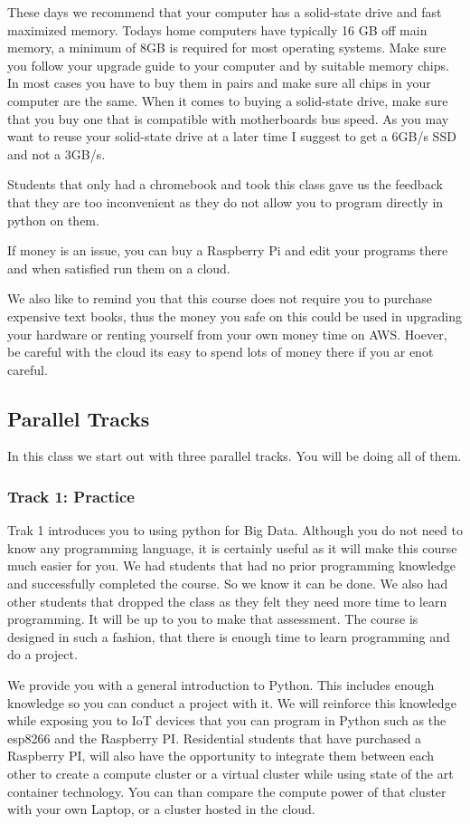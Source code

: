 These days we recommend that your computer has a solid-state drive and
fast maximized memory. Todays home computers have typically 16 GB off
main memory, a minimum of 8GB is required for most operating systems.
Make sure you follow your upgrade guide to your computer and by suitable
memory chips. In most cases you have to buy them in pairs and make sure
all chips in your computer are the same. When it comes to buying a
solid-state drive, make sure that you buy one that is compatible with
motherboards bus speed. As you may want to reuse your solid-state drive
at a later time I suggest to get a 6GB/s SSD and not a 3GB/s.

Students that only had a chromebook and took this class gave us the
feedback that they are too inconvenient as they do not allow you to
program directly in python on them.

If money is an issue, you can buy a Raspberry Pi and edit your programs
there and when satisfied run them on a cloud.

We also like to remind you that this course does not require you to
purchase expensive text books, thus the money you safe on this could be
used in upgrading your hardware or renting yourself from your own money
time on AWS. Hoever, be careful with the cloud its easy to spend lots of
money there if you ar enot careful.

\subsection{Parallel Tracks}

In this class we start out with three parallel tracks. You will be doing
all of them.

\subsubsection{Track 1: Practice}

Trak 1 introduces you to using python for Big Data. Although you do not
need to know any programming language, it is certainly useful as it will
make this course much easier for you. We had students that had no prior
programming knowledge and successfully completed the course. So we know
it can be done. We also had other students that dropped the class as
they felt they need more time to learn programming. It will be up to you
to make that assessment. The course is designed in such a fashion, that
there is enough time to learn programming and do a project.

We provide you with a general introduction to Python. This includes
enough knowledge so you can conduct a project with it. We will reinforce
this knowledge while exposing you to IoT devices that you can program in
Python such as the esp8266 and the Raspberry PI. Residential students
that have purchased a Raspberry PI, will also have the opportunity to
integrate them between each other to create a compute cluster or a
virtual cluster while using state of the art container technology. You
can than compare the compute power of that cluster with your own Laptop,
or a cluster hosted in the cloud.

